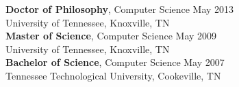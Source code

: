 {\bf Doctor of Philosophy}, Computer Science \hfill May 2013 \\
University of Tennessee, Knoxville, TN  \\

{\bf Master of Science}, Computer Science \hfill May 2009 \\
University of Tennessee, Knoxville, TN  \\

{\bf Bachelor of Science}, Computer Science \hfill May 2007 \\
Tennessee Technological University, Cookeville, TN  \\
